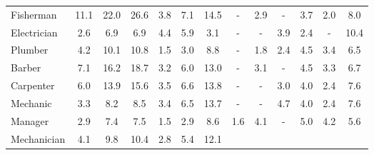 \begin{table*}[p]
{\begin{tabular}{l|ccc|ccc|ccc|ccc}
Fisherman
& \cellcolor{blue4} 11.1 & \cellcolor{blue8} 22.0 & \cellcolor{blue10} 26.6
& \cellcolor{blue1} 3.8 & \cellcolor{blue3} 7.1 & \cellcolor{blue5} 14.5
& \cellcolor{lightgray} - & \cellcolor{orange1} 2.9 & \cellcolor{lightgray} -
& \cellcolor{orange1} 3.7 & \cellcolor{orange1} 2.0 & \cellcolor{blue3} 8.0
\\
Electrician
& \cellcolor{blue1} 2.6 & \cellcolor{blue3} 6.9 & \cellcolor{blue3} 6.9
& \cellcolor{orange2} 4.4 & \cellcolor{orange2} 5.9 & \cellcolor{orange1} 3.1
& \cellcolor{lightgray} - & \cellcolor{lightgray} - & \cellcolor{blue2} 3.9
& \cellcolor{orange1} 2.4 & \cellcolor{lightgray} - & \cellcolor{blue4} 10.4
\\
Plumber
& \cellcolor{blue2} 4.2 & \cellcolor{blue4} 10.1 & \cellcolor{blue4} 10.8
& \cellcolor{blue1} 1.5 & \cellcolor{blue1} 3.0 & \cellcolor{blue3} 8.8
& \cellcolor{lightgray} - & \cellcolor{orange1} 1.8 & \cellcolor{blue1} 2.4
& \cellcolor{orange2} 4.5 & \cellcolor{orange1} 3.4 & \cellcolor{blue2} 6.5
\\
Barber
& \cellcolor{blue3} 7.1 & \cellcolor{blue6} 16.2 & \cellcolor{blue7} 18.7
& \cellcolor{blue1} 3.2 & \cellcolor{blue2} 6.0 & \cellcolor{blue5} 13.0
& \cellcolor{lightgray} - & \cellcolor{orange1} 3.1 & \cellcolor{lightgray} -
& \cellcolor{orange2} 4.5 & \cellcolor{orange1} 3.3 & \cellcolor{blue3} 6.7
\\
Carpenter
& \cellcolor{blue2} 6.0 & \cellcolor{blue5} 13.9 & \cellcolor{blue6} 15.6
& \cellcolor{blue1} 3.5 & \cellcolor{blue3} 6.6 & \cellcolor{blue5} 13.8
& \cellcolor{lightgray} - & \cellcolor{lightgray} - & \cellcolor{blue1} 3.0
& \cellcolor{orange2} 4.0 & \cellcolor{orange1} 2.4 & \cellcolor{blue3} 7.6
\\
Mechanic
& \cellcolor{blue1} 3.3 & \cellcolor{blue3} 8.2 & \cellcolor{blue3} 8.5
& \cellcolor{blue1} 3.4 & \cellcolor{blue2} 6.5 & \cellcolor{blue5} 13.7
& \cellcolor{lightgray} - & \cellcolor{lightgray} - & \cellcolor{blue2} 4.7
& \cellcolor{orange2} 4.0 & \cellcolor{orange1} 2.4 & \cellcolor{blue3} 7.6
\\
Manager
& \cellcolor{blue1} 2.9 & \cellcolor{blue3} 7.4 & \cellcolor{blue3} 7.5
& \cellcolor{blue1} 1.5 & \cellcolor{blue1} 2.9 & \cellcolor{blue3} 8.6
& \cellcolor{orange1} 1.6 & \cellcolor{orange2} 4.1 & \cellcolor{lightgray} -
& \cellcolor{orange2} 5.0 & \cellcolor{orange2} 4.2 & \cellcolor{blue2} 5.6
\\
Mechanician
& \cellcolor{blue2} 4.1 & \cellcolor{blue4} 9.8 & \cellcolor{blue4} 10.4
& \cellcolor{blue1} 2.8 & \cellcolor{blue2} 5.4 & \cellcolor{blue5} 12.1

\end{tabular}}
\end{table*}
